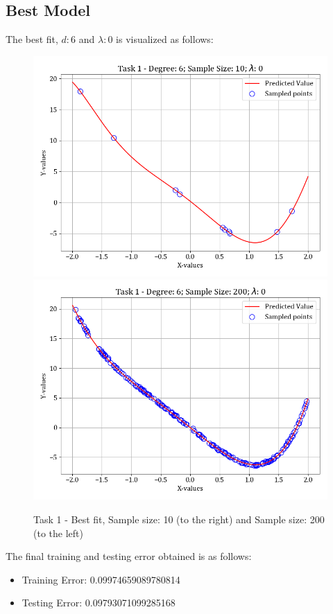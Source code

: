 \documentclass[12pt,a4paper]{article}
\newcommand{\noi}{\noindent}
\begin{document}
\subsection{Best Model}
The best fit, $d:6$ and $\lambda:0$ is visualized as follows:
\begin{figure}[H]
    \hspace{-2em}
    \includegraphics[scale=0.45]{images/t1_d1/d_6_size_10_l_0.png}
    \includegraphics[scale=0.45]{images/t1_d1/d_6_size_200_l_0.png}
    \caption{Task 1 - Best fit, Sample size: 10 (to the right) and Sample size: 200 (to the left)}
\end{figure}

\noi
The final training and testing error obtained is as follows:
\begin{itemize}
    \itemsep0em
    \item Training Error: 0.09974659089780814
    \item Testing Error: 0.09793071099285168
\end{itemize}
\end{document}
